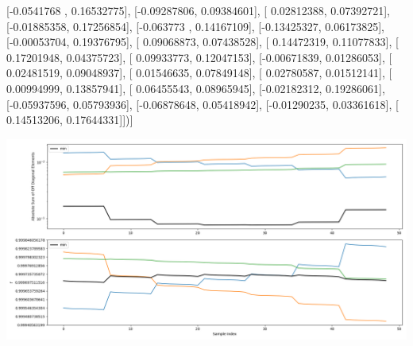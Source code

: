 \documentclass{article}
\begin{document}
       [-0.0541768 ,  0.16532775],
       [-0.09287806,  0.09384601],
       [ 0.02812388,  0.07392721],
       [-0.01885358,  0.17256854],
       [-0.063773  ,  0.14167109],
       [-0.13425327,  0.06173825],
       [-0.00053704,  0.19376795],
       [ 0.09068873,  0.07438528],
       [ 0.14472319,  0.11077833],
       [ 0.17201948,  0.04375723],
       [ 0.09933773,  0.12047153],
       [-0.00671839,  0.01286053],
       [ 0.02481519,  0.09048937],
       [ 0.01546635,  0.07849148],
       [ 0.02780587,  0.01512141],
       [ 0.00994999,  0.13857941],
       [ 0.06455543,  0.08965945],
       [-0.02182312,  0.19286061],
       [-0.05937596,  0.05793936],
       [-0.06878648,  0.05418942],
       [-0.01290235,  0.03361618],
       [ 0.14513206,  0.17644331]])]
\begin{center}
\includegraphics[scale=.9]{report_pickled_controls154/control_dpn_all.png}

\end{center}
\end{document}
